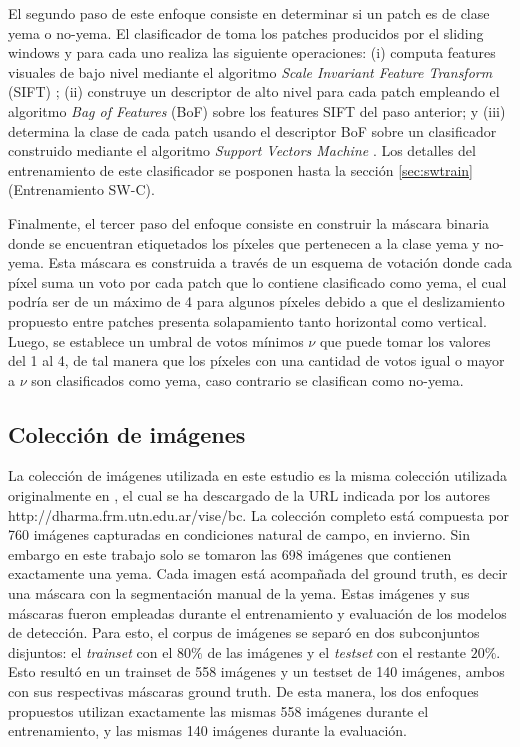 \documentclass[a4paper,authoryear,review]{elsarticle}
\begin{document}
El segundo paso de este enfoque consiste en determinar si un patch es de clase yema o no-yema. El clasificador de \citet{perez2017image} toma los patches producidos por el sliding windows y para cada uno realiza las siguiente operaciones: (i) computa features visuales de bajo nivel mediante el algoritmo \emph{Scale Invariant Feature Transform} (SIFT) \cite{lowe2004distinctive}; (ii) construye un descriptor de alto nivel para cada patch empleando el algoritmo \emph{Bag of Features} (BoF) \cite{csurka2004visual} sobre los features SIFT del paso anterior; y (iii) determina la clase de cada patch usando el descriptor BoF sobre un clasificador construido mediante el algoritmo \emph{Support Vectors Machine} \cite{vapnik2013nature}. Los detalles del entrenamiento de este clasificador se posponen hasta la sección \ref{sec:swtrain} (Entrenamiento SW-C).

Finalmente, el tercer paso del enfoque consiste en construir la máscara binaria donde se encuentran etiquetados los píxeles que pertenecen a la clase yema y no-yema. Esta máscara es construida a través de un esquema de votación donde cada píxel suma un voto por cada patch que lo contiene clasificado como yema, el cual podría ser de un máximo de 4 para algunos píxeles debido a que el deslizamiento propuesto entre patches presenta solapamiento tanto horizontal como vertical. Luego, se establece un umbral de votos mínimos $\nu$ que puede tomar los valores del 1 al 4, de tal manera que los píxeles con una cantidad de votos igual o mayor a $\nu$ son clasificados como yema, caso contrario se clasifican como no-yema.

\subsection{Colección de imágenes}
\label{sec:corpus}

La colección de imágenes utilizada en este estudio es la misma colección utilizada originalmente en \citet{perez2017image}, el cual se ha descargado de la URL indicada por los autores http://dharma.frm.utn.edu.ar/vise/bc. La colección completo está compuesta por 760 imágenes capturadas en condiciones natural de campo, en invierno. Sin embargo en este trabajo solo se tomaron las 698 imágenes que contienen exactamente una yema. Cada imagen está acompañada del ground truth, es decir una máscara con la segmentación manual de la yema. Estas imágenes y sus máscaras fueron empleadas durante el entrenamiento y evaluación de los modelos de detección. Para esto, el corpus de imágenes se separó en dos subconjuntos disjuntos: el \emph{trainset} con el $80\%$ de las imágenes y el \emph{testset} con el restante $20\%$. Esto resultó en un trainset de 558 imágenes y un testset de 140 imágenes, ambos con sus respectivas máscaras ground truth. De esta manera, los dos enfoques propuestos utilizan exactamente las mismas 558 imágenes durante el entrenamiento, y las mismas 140 imágenes durante la evaluación.
\end{document}
